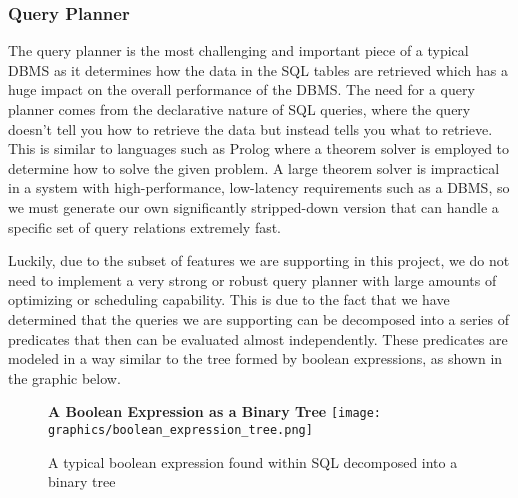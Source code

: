 \documentclass[letterpaper, 12pt]{article}
\begin{document}
\subsubsection{Query Planner}
The query planner is the most challenging and important piece of a typical DBMS as it
determines how the data in the SQL tables are retrieved which has a huge impact on 
the overall performance of the DBMS. The need for a query planner comes from the 
declarative nature of SQL queries, where the query doesn't tell you how to retrieve the
data but instead tells you what to retrieve. This is similar to languages such as Prolog where
a theorem solver is employed to determine how to solve the given problem. A large theorem 
solver is impractical in a system with high-performance, low-latency requirements such as 
a DBMS, so we must generate our own significantly stripped-down version that can handle a 
specific set of query relations extremely fast.
\par\vspace{\baselineskip}
Luckily, due to the subset of features we are supporting in this project, we do not need to 
implement a very strong or robust query planner with large amounts of optimizing or scheduling 
capability. This is due to the fact that we have determined that the queries we are supporting
can be decomposed into a series of predicates that then can be evaluated almost independently.
These predicates are modeled in a way similar to the tree formed by boolean expressions, as shown
in the graphic below.
\par\vspace{\baselineskip}
\begin{figure}
 \centering
 \textbf{A Boolean Expression as a Binary Tree}
 \texttt{[image: graphics/boolean\_expression\_tree.png]}
 \caption{A typical boolean expression found within SQL decomposed into a binary tree}
\end{figure}
\end{document}
